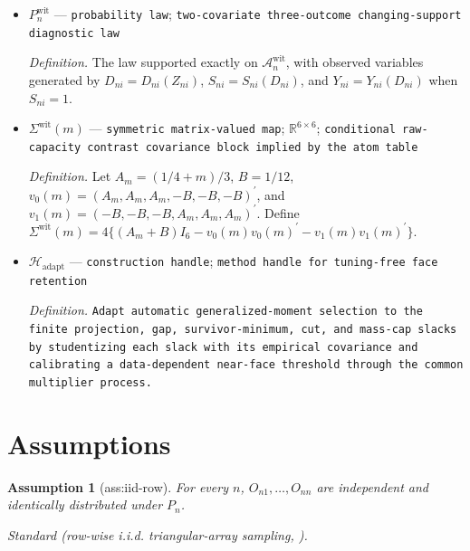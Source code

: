 \documentclass{article}
\newtheorem{assumption}{Assumption}
\begin{document}
\begin{itemize}
  \par\smallskip\noindent\emph{Definition.} For every \(x\in\{1,2\}\), \(z\in\{0,1\}\), and \(r\in\{0,1,2\}\), the table has exactly four rows \[(x,z,1,1,1,1,r,r;1/48),\quad(x,z,0,0,1,1,r,r;1/48),\] \[(x,z,0,1,1,1,r,r;m^{\mathrm{wit}}_{n,x}/12),\quad(x,z,0,1,0,0,r,r;(1/2-m^{\mathrm{wit}}_{n,x})/12).\] Each tuple lists \((X_{ni},Z_{ni},D_{ni}(0),D_{ni}(1),S_{ni}(0),S_{ni}(1),Y_{ni}(0),Y_{ni}(1);\text{probability})\), and every tuple not displayed has probability zero.
  \item \(P_n^{\mathrm{wit}}\) --- \texttt{probability law}; \texttt{two-\allowbreak{}covariate three-\allowbreak{}outcome changing-\allowbreak{}support diagnostic law}
  \par\smallskip\noindent\emph{Definition.} The law supported exactly on \(\mathcal A_n^{\mathrm{wit}}\), with observed variables generated by \(D_{ni}=D_{ni}(Z_{ni})\), \(S_{ni}=S_{ni}(D_{ni})\), and \(Y_{ni}=Y_{ni}(D_{ni})\) when \(S_{ni}=1\).
  \item \(\Sigma^{\mathrm{wit}}(m)\) --- \texttt{symmetric matrix-\allowbreak{}valued map}; \(\mathbb R^{6\times6}\); \texttt{conditional raw-\allowbreak{}capacity contrast covariance block implied by the atom table}
  \par\smallskip\noindent\emph{Definition.} Let \(A_m=(1/4+m)/3\), \(B=1/12\), \(v_0(m)=(A_m,A_m,A_m,-B,-B,-B)^{\prime}\), and \(v_1(m)=(-B,-B,-B,A_m,A_m,A_m)^{\prime}\). Define \(\Sigma^{\mathrm{wit}}(m)=4\{(A_m+B)I_6-v_0(m)v_0(m)^{\prime}-v_1(m)v_1(m)^{\prime}\}\).
  \item \(\mathcal H_{\mathrm{adapt}}\) --- \texttt{construction handle}; \texttt{method handle for tuning-\allowbreak{}free face retention}
  \par\smallskip\noindent\emph{Definition.} \texttt{Adapt automatic generalized-\allowbreak{}moment selection to the finite projection,\allowbreak{} gap,\allowbreak{} survivor-\allowbreak{}minimum,\allowbreak{} cut,\allowbreak{} and mass-\allowbreak{}cap slacks by studentizing each slack with its empirical covariance and calibrating a data-\allowbreak{}dependent near-\allowbreak{}face threshold through the common multiplier process.}
\end{itemize}

\section{Assumptions}

\begin{assumption}[ass:iid-row]\label{ass:iid-row}
For every \(n\), \(O_{n1},\ldots,O_{nn}\) are independent and identically distributed under \(P_n\).
\par\smallskip\noindent\emph{Standard} (row-wise i.i.d. triangular-array sampling, \cite{ChernozhukovChetverikovKato2017}).
\end{assumption}
\end{document}
